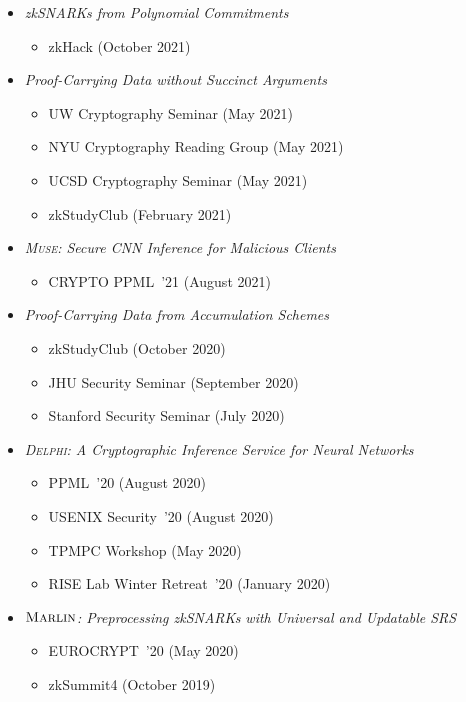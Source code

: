 \documentclass[11pt]{article}
\begin{document}
\begin{cv}{\vspace{-5em}}
\begin{itemize}
    \item[] \emph{zkSNARKs from Polynomial Commitments} 
    \begin{itemize}[noitemsep]
      \item[] zkHack (October 2021)
    \end{itemize}

    \item[] \emph{Proof-Carrying Data without Succinct Arguments} 
    \begin{itemize}[noitemsep]
      \item[] UW Cryptography Seminar (May 2021)
      \item[] NYU Cryptography Reading Group (May 2021)
      \item[] UCSD Cryptography Seminar (May 2021)
      \item[] zkStudyClub (February 2021)
    \end{itemize}

    \item[] \emph{\textsc{Muse}: Secure CNN Inference for Malicious Clients} 
    \begin{itemize}[noitemsep]
      \item[] CRYPTO PPML~'21 (August 2021)
    \end{itemize}

    \item[] \emph{Proof-Carrying Data from Accumulation Schemes} 
    \begin{itemize}[noitemsep]
      \item[] zkStudyClub (October 2020)
      \item[] JHU Security Seminar (September 2020)
      \item[] Stanford Security Seminar (July 2020)
    \end{itemize}

    \item[] \emph{\textsc{Delphi}: {A} Cryptographic Inference Service for Neural Networks} 
    \begin{itemize}[noitemsep]
      \item[] PPML~'20 (August 2020)
      \item[] USENIX Security~'20 (August 2020)
      \item[] TPMPC Workshop (May 2020)
      \item[] RISE Lab Winter Retreat~'20 (January 2020)
    \end{itemize}

    \item[] \emph{$\textsc{Marlin}$: Preprocessing {zkSNARKs} with Universal and Updatable {SRS}}
    \begin{itemize}[noitemsep]
      \item[] EUROCRYPT~'20 (May 2020)
      \item[] zkSummit4 (October 2019)
    \end{itemize}


\end{itemize}
\end{cv}
\end{document}
